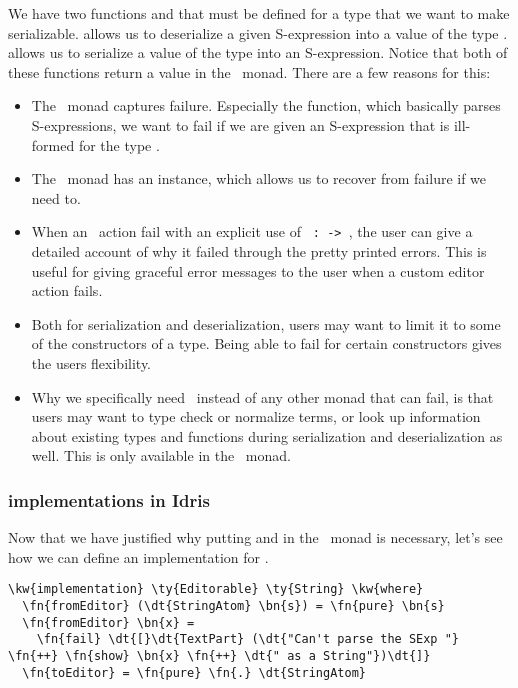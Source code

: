 We have two functions  and  that must be defined
for a type that we want to make serializable.
 allows us to deserialize a given S-expression into a value of the type .
 allows us to serialize a value of the type  into an S-expression.
Notice that both of these functions return a value in the \Elab\ monad.
There are a few reasons for this:
\begin{itemize}
  \item The \Elab\ monad captures failure. Especially the 
    function, which basically parses S-expressions, we want to fail if we are
    given an S-expression that is ill-formed for the type .
  \item The \Elab\ monad has an  instance, which allows us to
    recover from failure if we need to.
  \item When an \Elab\ action fail with an explicit use of
    \texttt{ :  ->  },
    the user can give a detailed account of why it failed through the pretty
    printed errors. This is useful for giving graceful error messages to the
    user when a custom editor action fails.
  \item Both for serialization and deserialization, users may want to limit it
    to some of the constructors of a type. Being able to fail for certain
    constructors gives the users flexibility.
  \item Why we specifically need \Elab\ instead of any other monad that can
    fail, is that users may want to type check or normalize terms, or look up
    information about existing types and functions during serialization and
    deserialization as well. This is only available in the \Elab\ monad.
\end{itemize}

\subsubsection{ implementations in Idris}

Now that we have justified why putting  and 
in the \Elab\ monad is necessary,
let's see how we can define an  implementation for .

\begin{Verbatim}[framesep=2mm, label=\footnotesize{\normalfont{Idris}}, labelposition=topline]
\kw{implementation} \ty{Editorable} \ty{String} \kw{where}
  \fn{fromEditor} (\dt{StringAtom} \bn{s}) = \fn{pure} \bn{s}
  \fn{fromEditor} \bn{x} =
    \fn{fail} \dt{[}\dt{TextPart} (\dt{"Can't parse the SExp "} \fn{++} \fn{show} \bn{x} \fn{++} \dt{" as a String"})\dt{]}
  \fn{toEditor} = \fn{pure} \fn{.} \dt{StringAtom}
\end{Verbatim}

